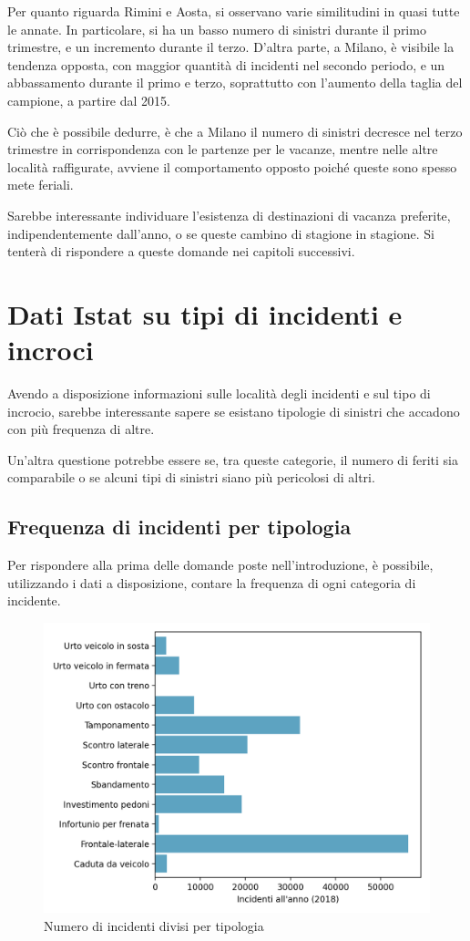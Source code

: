 \documentclass[a4paper,12pt]{report}
\begin{document}
Per quanto riguarda Rimini e Aosta, si osservano varie similitudini in quasi 
tutte le annate. 
In particolare, si ha un basso numero di sinistri 
durante il primo trimestre, e un incremento durante il terzo. 
D'altra parte, a Milano, è visibile la tendenza opposta, con maggior quantità di 
incidenti nel secondo periodo, e un abbassamento durante il primo 
e terzo, soprattutto con l'aumento della taglia del campione, 
a partire dal 2015. 

Ciò che è possibile dedurre, è che a Milano il numero di sinistri decresce 
nel terzo trimestre in corrispondenza con le partenze per le vacanze, mentre nelle 
altre località raffigurate, avviene il comportamento opposto poiché 
queste sono spesso mete feriali. 

Sarebbe interessante individuare l'esistenza di destinazioni di vacanza preferite, 
indipendentemente dall'anno, o se queste cambino di stagione in stagione. 
Si tenterà di rispondere a queste domande nei capitoli successivi. 

\section{Dati Istat su tipi di incidenti e incroci}

Avendo a disposizione informazioni sulle località degli incidenti 
e sul tipo di incrocio, 
sarebbe interessante sapere se esistano tipologie di sinistri che accadono 
con più frequenza di altre. 

Un'altra questione potrebbe essere se, tra queste categorie, il numero di feriti 
sia comparabile o se alcuni tipi di sinistri siano più pericolosi di altri. 

\subsection{Frequenza di incidenti per tipologia}

Per rispondere alla prima delle domande poste nell'introduzione, è possibile, 
utilizzando i dati a disposizione, contare la frequenza di ogni categoria di incidente. 

\begin{figure}
    \hfill\includegraphics[width=0.7\linewidth]{../src/incidenti/incidenti_senza_coords/localizzazione_incidente/tipo_incidente.png}\hspace*{\fill}
    \caption{Numero di incidenti divisi per tipologia}
    \label{fig:tipo-incidente}
\end{figure}
\end{document}
